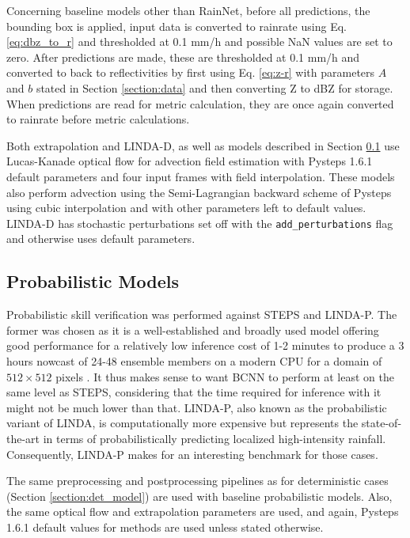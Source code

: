 Concerning baseline models other than RainNet, before all predictions, the bounding box is applied, input data is converted to rainrate using Eq. \eqref{eq:dbz_to_r} and thresholded at 0.1 mm/h and possible NaN values are set to zero. After predictions are made, these are thresholded at 0.1 mm/h and converted to back to reflectivities by first using Eq. \eqref{eq:z-r} with parameters $A$ and $b$ stated in Section \ref{section:data} and then converting Z to dBZ for storage. When predictions are read for metric calculation, they are once again converted to rainrate before metric calculations.

Both extrapolation and LINDA-D, as well as models described in Section \ref{section:prob_model} use Lucas-Kanade optical flow for advection field estimation with Pysteps \cite{pulkkinen_pysteps_2019} 1.6.1 default parameters and four input frames with field interpolation. These models also perform advection using the Semi-Lagrangian backward scheme of Pysteps using cubic interpolation and with other parameters left to default values. LINDA-D has stochastic perturbations set off with the \texttt{add\_perturbations} flag and otherwise uses default parameters. 


\subsection{Probabilistic Models}
\label{section:prob_model}

Probabilistic skill verification was performed against STEPS and LINDA-P. The former was chosen as it is a well-established and broadly used model offering good performance for a relatively low inference cost of 1-2 minutes to produce a 3 hours nowcast of 24-48 ensemble members on a modern CPU for a domain of $512 \times 512$ pixels \cite{pulkkinen_pysteps_2019}. It thus makes sense to want BCNN to perform at least on the same level as STEPS, considering that the time required for inference with it might not be much lower than that. LINDA-P, also known as the probabilistic variant of LINDA, is computationally more expensive but represents the state-of-the-art in terms of probabilistically predicting localized high-intensity rainfall. Consequently, LINDA-P makes for an interesting benchmark for those cases. 

The same preprocessing and postprocessing pipelines as for deterministic cases (Section \ref{section:det_model}) are used with baseline probabilistic models. Also, the same optical flow and extrapolation parameters are used, and again, Pysteps 1.6.1 default values for methods are used unless stated otherwise. 


